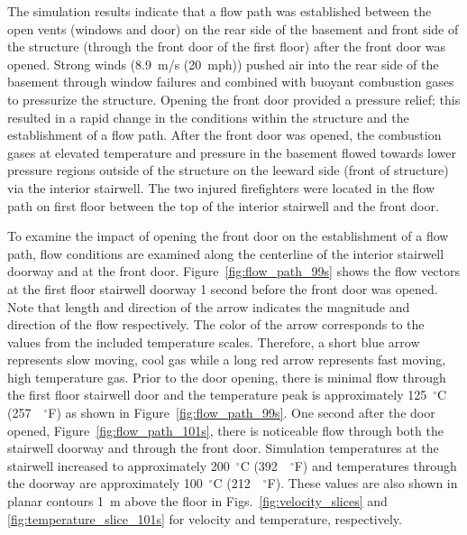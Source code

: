 \documentclass[12pt,oneside]{book}
\begin{document}
The simulation results indicate that a flow path was established between the open vents (windows and door) on the rear side of the basement and front side of the structure (through the front door of the first floor) after the front door was opened. Strong winds (8.9~m/s (20~mph)) pushed air into the rear side of the basement through window failures and combined with buoyant combustion gases to pressurize the structure. Opening the front door provided a pressure relief; this resulted in a rapid change in the conditions within the structure and the establishment of a flow path. After the front door was opened, the combustion gases at elevated temperature and pressure in the basement flowed towards lower pressure regions outside of the structure on the leeward side (front of structure) via the interior stairwell. The two injured firefighters were located in the flow path on first floor between the top of the interior stairwell and the front door.

To examine the impact of opening the front door on the establishment of a flow path, flow conditions are examined along the centerline of the interior stairwell doorway and at the front door. Figure~\ref{fig:flow_path_99s} shows the flow vectors at the first floor stairwell doorway 1 second before the front door was opened. Note that length and direction of the arrow indicates the magnitude and direction of the flow respectively. The color of the arrow corresponds to the values from the included temperature scales. Therefore, a short blue arrow represents slow moving, cool gas while a long red arrow represents fast moving, high temperature gas. Prior to the door opening, there is minimal flow through the first floor stairwell door and the temperature peak is approximately 125~$^{\circ}$C (257~~$^{\circ}$F) as shown in Figure~\ref{fig:flow_path_99s}. One second after the door opened, Figure~\ref{fig:flow_path_101s}, there is noticeable flow through both the stairwell doorway and through the front door. Simulation temperatures at the stairwell increased to approximately 200~$^{\circ}$C (392~~$^{\circ}$F) and temperatures through the doorway are approximately 100~$^{\circ}$C (212~~$^{\circ}$F). These values are also shown in planar contours 1~m above the floor in Figs.~\ref{fig:velocity_slices} and \ref{fig:temperature_slice_101s} for velocity and temperature, respectively.
\end{document}
